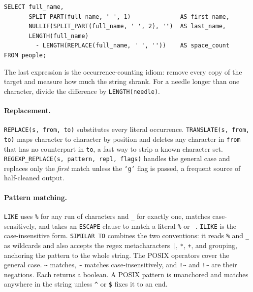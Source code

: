 \begin{lstlisting}[style=sql, caption={Parsing a delimited name field}]
SELECT full_name,
       SPLIT_PART(full_name, ' ', 1)              AS first_name,
       NULLIF(SPLIT_PART(full_name, ' ', 2), '')  AS last_name,
       LENGTH(full_name)
         - LENGTH(REPLACE(full_name, ' ', ''))    AS space_count
FROM people;
\end{lstlisting}

\vspace{-1ex}

The last expression is the occurrence-counting idiom: remove every copy of the
target and measure how much the string shrank. For a needle longer than one
character, divide the difference by \texttt{LENGTH(needle)}.

\paragraph{Replacement.} \texttt{REPLACE(s, from, to)} substitutes every
literal occurrence. \texttt{TRANSLATE(s, from, to)} maps character to character
by position and deletes any character in \texttt{from} that has no counterpart
in \texttt{to}, a fast way to strip a known character set.
\texttt{REGEXP\_REPLACE(s, pattern, repl, flags)} handles the general case and
replaces only the \emph{first} match unless the \texttt{`g'} flag is passed, a
frequent source of half-cleaned output.

\paragraph{Pattern matching.} \texttt{LIKE} uses \texttt{\%} for any run of characters and \texttt{\_} for exactly one, matches case-sensitively, and takes an \texttt{ESCAPE} clause to match a literal \texttt{\%} or \texttt{\_}. \texttt{ILIKE} is the case-insensitive form. \texttt{SIMILAR TO} combines the two conventions: it reads \texttt{\%} and \texttt{\_} as wildcards and also accepts the regex metacharacters \texttt{|}, \texttt{*}, \texttt{+}, and grouping, anchoring the pattern to the whole string. The POSIX operators cover the general case. \texttt{\textasciitilde} matches, \texttt{\textasciitilde*} matches case-insensitively, and \texttt{!\textasciitilde} and \texttt{!\textasciitilde*} are their negations. Each returns a boolean. A POSIX pattern is unanchored and matches anywhere in the string unless \texttt{\^{}} or \texttt{\$} fixes it to an end.

\vspace{1ex}

